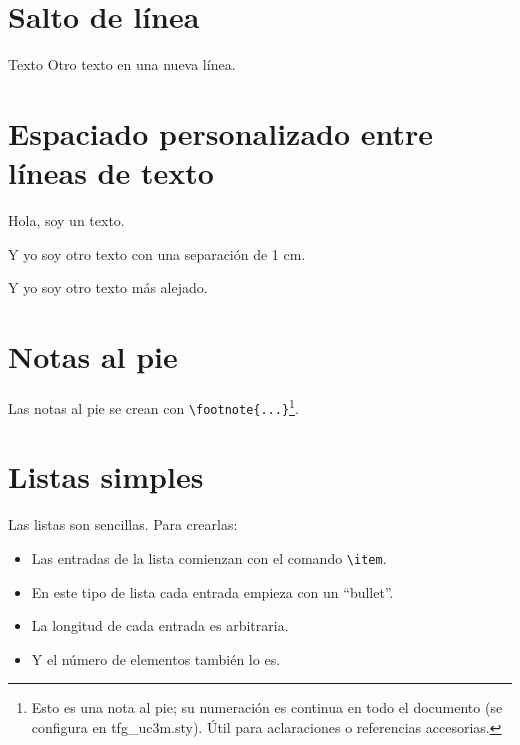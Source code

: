 \newpage


\section{Salto de línea}

Texto
\newline
Otro texto en una nueva línea.


\section{Espaciado personalizado entre líneas de texto}

Hola, soy un texto.

\vspace{1cm}
Y yo soy otro texto con una separación de 1 cm.

\vspace{50pt}
Y yo soy otro texto más alejado.


\section{Notas al pie}

Las notas al pie se crean con \verb|\footnote{...}|\footnote{Esto es una nota al pie; su numeración es continua en todo el documento (se configura en tfg\_uc3m.sty). Útil para aclaraciones o referencias accesorias.}.




\section{Listas simples}

Las listas son sencillas. Para crearlas:
\begin{itemize}
  \item Las entradas de la lista comienzan con el comando \verb|\item|.
  \item En este tipo de lista cada entrada empieza con un ``bullet''.
  \item La longitud de cada entrada es arbitraria.
  \item Y el número de elementos también lo es.
\end{itemize}


